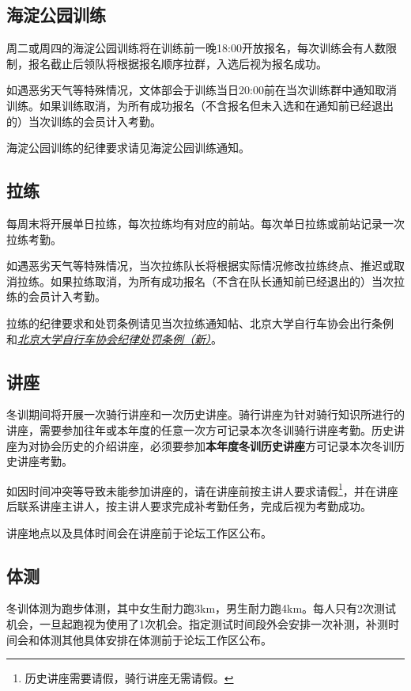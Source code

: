 \documentclass[UTF8]{ctexart}
\begin{document}
\subsection{海淀公园训练}

周二或周四的海淀公园训练将在训练前一晚18:00开放报名，每次训练会有人数限制，报名截止后领队将根据报名顺序拉群，入选后视为报名成功。

如遇恶劣天气等特殊情况，文体部会于训练当日20:00前在当次训练群中通知取消训练。如果训练取消，为所有成功报名（不含报名但未入选和在通知前已经退出的）当次训练的会员计入考勤。

海淀公园训练的纪律要求请见海淀公园训练通知。%

\subsection{拉练}

每周末将开展单日拉练，每次拉练均有对应的前站。每次单日拉练或前站记录一次拉练考勤。

如遇恶劣天气等特殊情况，当次拉练队长将根据实际情况修改拉练终点、推迟或取消拉练。如果拉练取消，为所有成功报名（不含在队长通知前已经退出的）当次拉练的会员计入考勤。

拉练的纪律要求和处罚条例请见当次拉练通知帖、北京大学自行车协会出行条例%
和\href{https://chexie.net/bbs/content/?bid=1&tid=9260&p=1}{\textit{北京大学自行车协会纪律处罚条例（新）}}。

\subsection{讲座}


冬训期间将开展一次骑行讲座和一次历史讲座。骑行讲座为针对骑行知识所进行的讲座，需要参加往年或本年度的任意一次方可记录本次冬训骑行讲座考勤。历史讲座为对协会历史的介绍讲座，必须要参加\textbf{本年度冬训历史讲座}方可记录本次冬训历史讲座考勤。

如因时间冲突等导致未能参加讲座的，请在讲座前按主讲人要求请假\footnote{历史讲座需要请假，骑行讲座无需请假。}，并在讲座后联系讲座主讲人，按主讲人要求完成补考勤任务，完成后视为考勤成功。

讲座地点以及具体时间会在讲座前于论坛工作区公布。

\subsection{体测}

冬训体测为跑步体测，其中女生耐力跑3km，男生耐力跑4km。每人只有2次测试机会，一旦起跑视为使用了1次机会。指定测试时间段外会安排一次补测，补测时间会和体测其他具体安排在体测前于论坛工作区公布。
\end{document}
